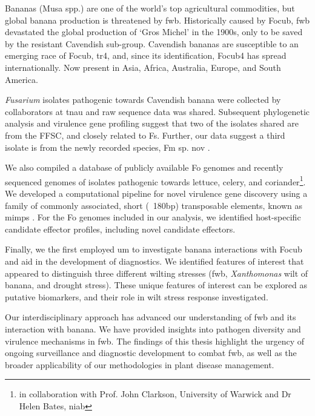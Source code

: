 Bananas (Musa spp.) are one of the world’s top agricultural commodities, but global banana production is threatened by \acf{fwb}. Historically caused by \acf{Focub}, \acf{fwb} devastated the global production of ‘Gros Michel’ in the 1900s, only to be saved by the resistant Cavendish sub-group. Cavendish bananas are susceptible to an emerging race of \acf{Focub}, \ac{tr4}, and, since its identification, \ac{Focub4} has spread internationally. Now present in Asia, Africa, Australia, Europe, and South America. 

\textit{Fusarium} isolates pathogenic towards Cavendish banana were collected by collaborators at \acf{tnau} and raw sequence data was shared. Subsequent phylogenetic analysis and virulence gene profiling suggest that two of the isolates shared are from the \acl{FFSC}, and closely related to \acl{Fs}. Further, our data suggest a third isolate is from the newly recorded species, \acl{Fm} sp. nov \parencite{Nozawa2023}. 

We also compiled a database of publicly available \acf{Fo} genomes and recently sequenced genomes of isolates pathogenic towards lettuce, celery, and coriander\footnote{in collaboration with Prof. John Clarkson, University of Warwick and Dr Helen Bates, \acl{niab}}. We developed a computational pipeline for novel virulence gene discovery using a family of commonly associated, short (~180bp) transposable elements, known as \aclp{mimp} \parencite{Schmidt2013}. For the \ac{Fo} genomes included in our analysis, we identified host-specific candidate effector profiles, including novel candidate effectors.

Finally, we the first employed \acl{um} to investigate banana interactions with \ac{Focub} and aid in the development of diagnostics. We identified features of interest that appeared to distinguish three different wilting stresses (\ac{fwb}, \textit{Xanthomonas} wilt of banana, and drought stress). These unique features of interest can be explored as putative biomarkers, and their role in wilt stress response investigated. 

Our interdisciplinary approach has advanced our understanding of \ac{fwb} and its interaction with banana. We have provided insights into pathogen diversity and virulence mechanisms in \ac{fwb}. The findings of this thesis highlight the urgency of ongoing surveillance and diagnostic development to combat \ac{fwb}, as well as the broader applicability of our methodologies in plant disease management. 
